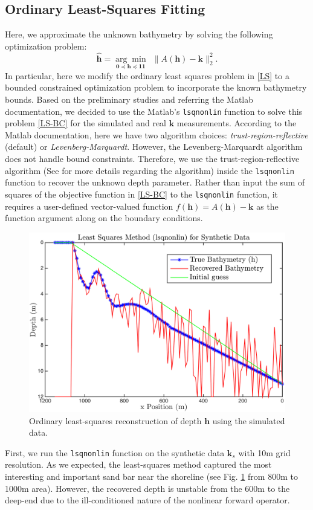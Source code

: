 \subsection{Ordinary Least-Squares Fitting}
Here, we approximate the unknown bathymetry by solving the following optimization problem:
\begin{equation}\label{LS-BC}
\mathbf{\hat{h}}= \underset{\mathbf{0} \preceq \mathbf{h} \preceq \mathbf{11} }{\arg \min} \ \  \|  A(\mathbf{h}) -  \mathbf{k} \|_2^2.
\end{equation}
In particular, here we modify the ordinary least squares problem in \eqref{LS} to a bounded constrained optimization problem to incorporate the known bathymetry bounds. Based on the preliminary studies and referring the Matlab documentation, we decided to use the Matlab's \verb|lsqnonlin| function to solve this problem \eqref{LS-BC} for the simulated and real $\mathbf{k}$ measurements. According to the Matlab documentation, here we have two algorithm choices: \textit{trust-region-reflective} (default) or \textit{Levenberg-Marquardt}. However, the Levenberg-Marquardt algorithm does not handle bound constraints. Therefore, we use the trust-region-reflective algorithm (See \cite{trustregion} for more details regarding the algorithm) inside the \verb|lsqnonlin| function to recover the unknown depth parameter. Rather than input the sum of squares of the objective function in \eqref{LS-BC} to the \verb|lsqnonlin| function, it requires a user-defined vector-valued function $f(\mathbf{h}) = A(\mathbf{h}) -  \mathbf{k}$ as the function argument along on the boundary conditions. 

\begin{figure}[H]
\center
\includegraphics[scale=0.6]{img/lsqnonlin_simulated_10m.png} %
\caption{Ordinary least-squares reconstruction of depth $\mathbf{h}$ using the simulated data.}
\label{lsqnonlin_simulated}
\end{figure}
First, we run the \verb|lsqnonlin| function on the synthetic data $\mathbf{k}_s$ with 10m grid resolution. As we expected, the least-squares method captured the most interesting and important sand bar near the shoreline (see Fig. \ref{lsqnonlin_simulated} from 800m to 1000m area). However, the recovered depth is unstable from the 600m to the deep-end due to the ill-conditioned nature of the nonlinear forward operator. 

